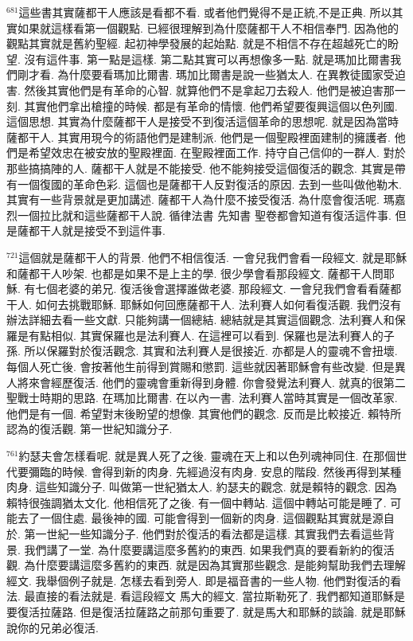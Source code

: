 \documentclass{book}
\begin{document}
$^{681}$這些書其實薩都干人應該是看都不看.
或者他們覺得不是正統,不是正典.
所以其實如果就這樣看第一個觀點.
已經很理解到為什麼薩都干人不相信奉門.
因為他的觀點其實就是舊約聖經.
起初神學發展的起始點.
就是不相信不存在超越死亡的盼望.
沒有這件事.
第一點是這樣.
第二點其實可以再想像多一點.
就是瑪加比爾書我們剛才看.
為什麼要看瑪加比爾書.
瑪加比爾書是說一些猶太人.
在異教徒國家受迫害.
然後其實他們是有革命的心智.
就算他們不是拿起刀去殺人.
他們是被迫害那一刻.
其實他們拿出槍撞的時候.
都是有革命的情懷.
他們希望要復興這個以色列國.
這個思想.
其實為什麼薩都干人是接受不到復活這個革命的思想呢.
就是因為當時薩都干人.
其實用現今的術語他們是建制派.
他們是一個聖殿裡面建制的擁護者.
他們是希望效忠在被安放的聖殿裡面.
在聖殿裡面工作.
持守自己信仰的一群人.
對於那些搞搞陣的人.
薩都干人就是不能接受.
他不能夠接受這個復活的觀念.
其實是帶有一個復國的革命色彩.
這個也是薩都干人反對復活的原因.
去到一些叫做他勒木.
其實有一些背景就是更加講述.
薩都干人為什麼不接受復活.
為什麼會復活呢.
瑪嘉烈一個拉比就和這些薩都干人說.
循律法書 先知書 聖卷都會知道有復活這件事.
但是薩都干人就是接受不到這件事.

$^{721}$這個就是薩都干人的背景.
他們不相信復活.
一會兒我們會看一段經文.
就是耶穌和薩都干人吵架.
也都是如果不是上主的學.
很少學會看那段經文.
薩都干人問耶穌.
有七個老婆的弟兄.
復活後會選擇誰做老婆.
那段經文.
一會兒我們會看看薩都干人.
如何去挑戰耶穌.
耶穌如何回應薩都干人.
法利賽人如何看復活觀.
我們沒有辦法詳細去看一些文獻.
只能夠講一個總結.
總結就是其實這個觀念.
法利賽人和保羅是有點相似.
其實保羅也是法利賽人.
在這裡可以看到.
保羅也是法利賽人的子孫.
所以保羅對於復活觀念.
其實和法利賽人是很接近.
亦都是人的靈魂不會扭壞.
每個人死亡後.
會按著他生前得到賞賜和懲罰.
這些就因著耶穌會有些改變.
但是異人將來會經歷復活.
他們的靈魂會重新得到身體.
你會發覺法利賽人.
就真的很第二聖戰士時期的思路.
在瑪加比爾書.
在以內一書.
法利賽人當時其實是一個改革家.
他們是有一個.
希望對末後盼望的想像.
其實他們的觀念.
反而是比較接近.
賴特所認為的復活觀.
第一世紀知識分子.

$^{761}$約瑟夫會怎樣看呢.
就是異人死了之後.
靈魂在天上和以色列魂神同住.
在那個世代要彌臨的時候.
會得到新的肉身.
先經過沒有肉身.
安息的階段.
然後再得到某種肉身.
這些知識分子.
叫做第一世紀猶太人.
約瑟夫的觀念.
就是賴特的觀念.
因為賴特很強調猶太文化.
他相信死了之後.
有一個中轉站.
這個中轉站可能是睡了.
可能去了一個住處.
最後神的國.
可能會得到一個新的肉身.
這個觀點其實就是源自於.
第一世紀一些知識分子.
他們對於復活的看法都是這樣.
其實我們去看這些背景.
我們講了一堂.
為什麼要講這麼多舊約的東西.
如果我們真的要看新約的復活觀.
為什麼要講這麼多舊約的東西.
就是因為其實那些觀念.
是能夠幫助我們去理解經文.
我舉個例子就是.
怎樣去看到旁人.
即是福音書的一些人物.
他們對復活的看法.
最直接的看法就是.
看這段經文 馬大的經文.
當拉斯勒死了.
我們都知道耶穌是要復活拉薩路.
但是復活拉薩路之前那句重要了.
就是馬大和耶穌的談論.
就是耶穌說你的兄弟必復活.
\end{document}

